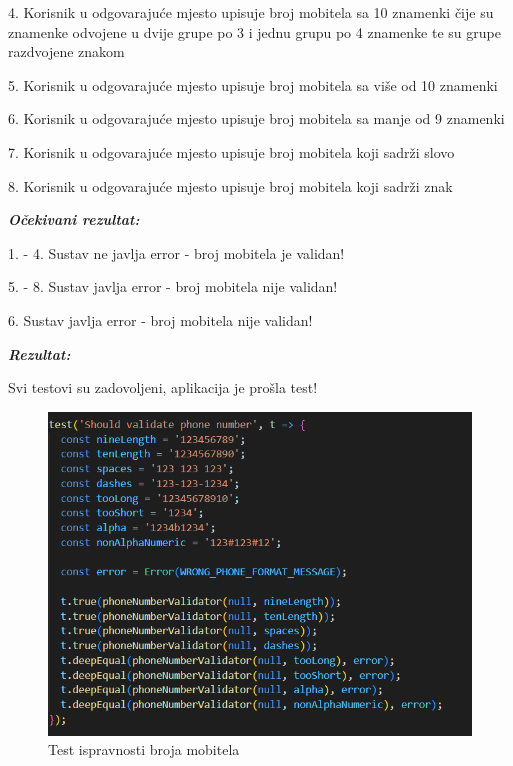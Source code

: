              4. Korisnik u odgovarajuće mjesto upisuje broj mobitela sa 10 znamenki čije su znamenke odvojene u dvije grupe po 3 i jednu grupu po 4 znamenke te su grupe razdvojene znakom 

             5. Korisnik u odgovarajuće mjesto upisuje broj mobitela sa više od 10 znamenki

             6. Korisnik u odgovarajuće mjesto upisuje broj mobitela sa manje od 9 znamenki

             7. Korisnik u odgovarajuće mjesto upisuje broj mobitela koji sadrži slovo

             8. Korisnik u odgovarajuće mjesto upisuje broj mobitela koji sadrži znak 

            \textbf{\textit{Očekivani rezultat:}}

             1. - 4. Sustav ne javlja error - broj mobitela je validan!

             5. - 8. Sustav javlja error - broj mobitela nije validan!

             6. Sustav javlja error - broj mobitela nije validan!

             \textbf{\textit{Rezultat:}}

             Svi testovi su zadovoljeni, aplikacija je prošla test!

\begin{figure}[H]
			\includegraphics[scale=0.5]{slike/numberTest.PNG} %
			\centering
			\caption{Test ispravnosti broja mobitela}
			\label{fig:bbb}
			
		\end{figure}


